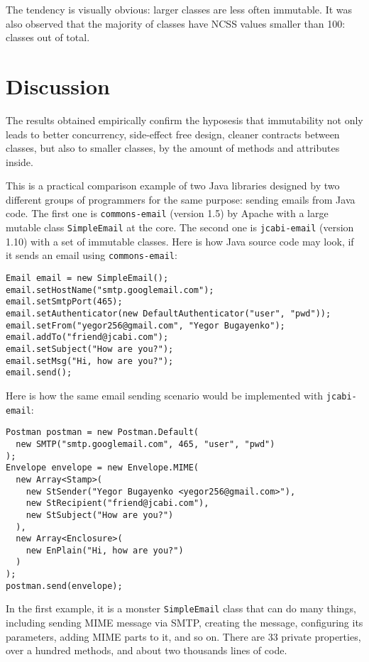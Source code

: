 \documentclass[3p,times,procedia]{elsarticle}
\newcommand{\code}[1]{\texttt{#1}}
\begin{document}
The tendency is visually obvious: larger classes are less often immutable. It
was also observed that the majority of classes have NCSS values smaller than 100:
\thebelowhundred{} classes out of \thetotaljavafiles{} total.

\section{Discussion}
\label{sec:discussion}

The results obtained empirically confirm the hyposesis that immutability
not only leads to better concurrency, side-effect free design, cleaner
contracts between classes, but also to smaller classes, by the amount of
methods and attributes inside.

This is a practical comparison example of two Java libraries designed
by two different groups of programmers for the same purpose: sending emails from Java code.
The first one is \code{commons-email} (version 1.5) by Apache with
a large mutable class \code{SimpleEmail} at the core.
The second one is \code{jcabi-email} (version 1.10) with a set of immutable classes.
Here is how Java source code may look, if it sends an email using \code{commons-email}:

\begin{verbatim}
Email email = new SimpleEmail();
email.setHostName("smtp.googlemail.com");
email.setSmtpPort(465);
email.setAuthenticator(new DefaultAuthenticator("user", "pwd"));
email.setFrom("yegor256@gmail.com", "Yegor Bugayenko");
email.addTo("friend@jcabi.com");
email.setSubject("How are you?");
email.setMsg("Hi, how are you?");
email.send();
\end{verbatim}

Here is how the same email sending scenario would be
implemented with \code{jcabi-email}:

\begin{verbatim}
Postman postman = new Postman.Default(
  new SMTP("smtp.googlemail.com", 465, "user", "pwd")
);
Envelope envelope = new Envelope.MIME(
  new Array<Stamp>(
    new StSender("Yegor Bugayenko <yegor256@gmail.com>"),
    new StRecipient("friend@jcabi.com"),
    new StSubject("How are you?")
  ),
  new Array<Enclosure>(
    new EnPlain("Hi, how are you?")
  )
);
postman.send(envelope);
\end{verbatim}

In the first example, it is a monster \code{SimpleEmail} class that can do many things, including
sending MIME message via SMTP, creating the message, configuring
its parameters, adding MIME parts to it, and so on. There are 33 private properties, over
a hundred methods, and about two thousands lines of code.
\end{document}
